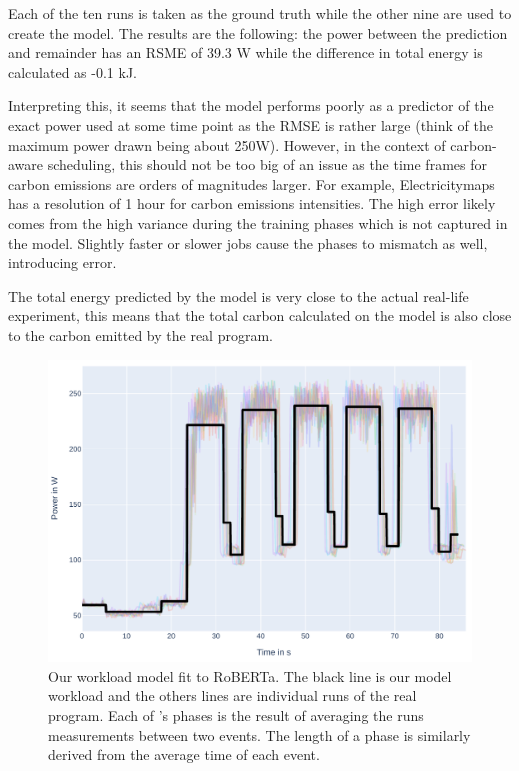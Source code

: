 Each of the ten runs is taken as the ground truth while the other nine are used to create the model. 
The results are the following: the power between the prediction and remainder has an RSME of 39.3 W while the difference in total energy is calculated as -0.1 kJ. 

Interpreting this, it seems that the model performs poorly as a predictor of the exact power used at some time point as the RMSE is rather large (think of the maximum power drawn being about 250W). 
However, in the context of carbon-aware scheduling, this should not be too big of an issue as the time frames for carbon emissions are orders of magnitudes larger. 
For example, Electricitymaps has a resolution of 1 hour for carbon emissions intensities. 
The high error likely comes from the high variance during the training phases which is not captured in the model.
Slightly faster or slower jobs cause the phases to mismatch as well, introducing error.

The total energy predicted by the model is very close to the actual real-life experiment, this means that the total carbon calculated on the model is also close to the carbon emitted by the real program.

\begin{figure}
    \includegraphics[width=\linewidth]{power-measurements/model_overlaid.pdf}
    \caption{Our \modelname{} workload model fit to RoBERTa. The black line is our model workload and the others lines are individual runs of the real program. Each of \modelname{}'s phases is the result of averaging the runs measurements between two events. The length of a phase is similarly derived from the average time of each event.}
    \label{fig:model_overlaid}
\end{figure}
